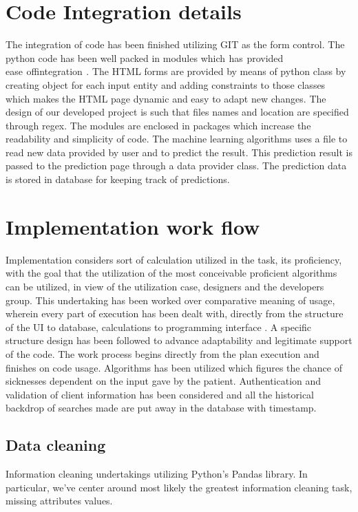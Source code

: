 \documentclass[oneside,12pt]{Classes/VTU}
\begin{document}
	\section{Code Integration details}
	The integration of code has been finished utilizing GIT as the form control. The python code has been well packed in modules which\tiny\textcolor{white}{s}\normalsize has\tiny\textcolor{white}{s}\normalsize provided ease\tiny\textcolor{white}{s}\normalsize of\tiny\textcolor{white}{f}\normalsize integration\tiny\textcolor{white}{s}\normalsize . The HTML forms are provided by means of python class by creating object for each input entity and adding constraints to those classes which makes the HTML page dynamic and easy to adapt new changes. The design of our developed project is such that files names and location are specified through regex. The modules are enclosed in packages which increase the readability and simplicity of code. The machine learning algorithms uses a file to read new data provided by user and to predict the result. This prediction result is passed to the prediction page through a data provider class. The prediction data is stored in database for keeping track of predictions.
	
	\section{Implementation work flow}
	Implementation considers sort of calculation utilized in the task, its proficiency, with the goal that the utilization of the most conceivable proficient algorithms can be utilized, in view of the utilization case, designers and the developers group. This undertaking has been worked over comparative meaning of usage, wherein every part of execution has been dealt with, directly from the structure of the UI to database, calculations to programming interface . A specific structure design has been followed to advance adaptability and legitimate support of the code. The work process begins directly from the plan execution and finishes on code usage. Algorithms has been utilized which figures the chance of sicknesses dependent on the input gave by the patient. Authentication and validation of client information has been considered and all the historical backdrop of searches made are put away in the database with timestamp.
	\subsection{Data cleaning}
	Information cleaning undertakings utilizing Python's Pandas library. In particular, we've center around most likely the greatest information cleaning task, missing attributes values.
\end{document}
